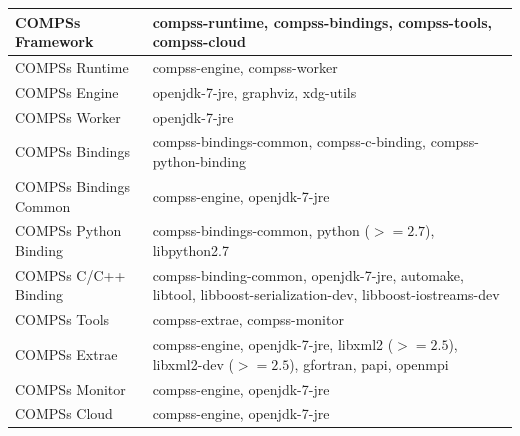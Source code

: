 \bgroup
  \def\arraystretch{1.5}
  \begin{center}
    \begin{tabular}{ p{6cm} | p{10cm} }
    COMPSs Framework 		& compss-runtime, compss-bindings, compss-tools, compss-cloud \\ \hline 
    COMPSs Runtime 		& compss-engine, compss-worker \\ \hline  
    COMPSs Engine 		& openjdk-7-jre, graphviz, xdg-utils \\ \hline 
    COMPSs Worker 		& openjdk-7-jre \\ \hline 
    COMPSs Bindings 		& compss-bindings-common, compss-c-binding, compss-python-binding \\ \hline 
    COMPSs Bindings Common 	& compss-engine, openjdk-7-jre \\ \hline 
    COMPSs Python Binding 	& compss-bindings-common, python ($>= 2.7$), libpython2.7 \\ \hline 
    COMPSs C/C++ Binding 	& compss-binding-common, openjdk-7-jre, automake, libtool, libboost-serialization-dev, libboost-iostreams-dev \\ \hline 
    COMPSs Tools 		& compss-extrae, compss-monitor \\ \hline 
    COMPSs Extrae 		& compss-engine, openjdk-7-jre, libxml2 ($>= 2.5$), libxml2-dev ($>= 2.5$), gfortran, papi, openmpi \\ \hline 
    COMPSs Monitor 		& compss-engine, openjdk-7-jre \\ \hline 
    COMPSs Cloud 		& compss-engine, openjdk-7-jre    
    \end{tabular}
  \end{center}
\egroup